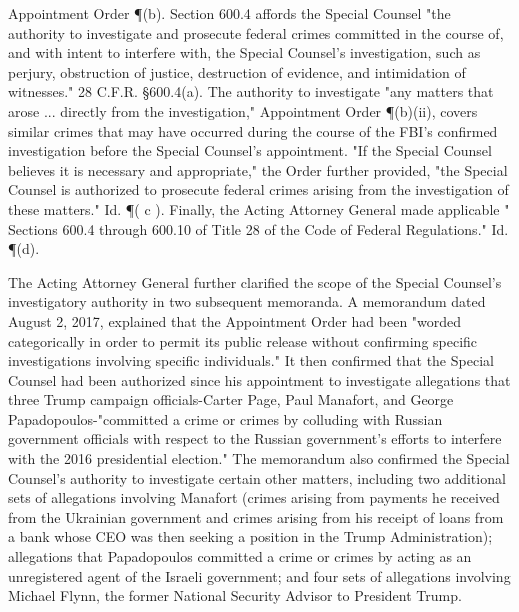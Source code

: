 \documentclass{article}
\begin{document}
Appointment Order \P (b). Section 600.4 affords the Special Counsel "the authority to investigate and prosecute federal crimes committed in the course of, and with intent to interfere with, the Special Counsel's investigation, such as perjury, obstruction of justice, destruction of evidence, and intimidation of witnesses." 28 C.F.R. \S 600.4(a).
The authority to investigate "any matters that arose ... directly from the investigation," Appointment Order \P (b)(ii), covers similar crimes that may have occurred during the course of the FBI's confirmed investigation before the Special Counsel's appointment.
"If the Special Counsel believes it is necessary and appropriate," the Order further provided, "the Special Counsel is authorized to prosecute federal crimes arising from the investigation of these matters." Id. \P ( c ).
Finally, the Acting Attorney General made applicable " Sections 600.4 through 600.10 of Title 28 of the Code of Federal Regulations." Id. \P (d).

The Acting Attorney General further clarified the scope of the Special Counsel's investigatory authority in two subsequent memoranda.
A memorandum dated August 2, 2017, explained that the Appointment Order had been "worded categorically in order to permit its public release without confirming specific investigations involving specific individuals."
It then confirmed that the Special Counsel had been authorized since his appointment to investigate allegations that three Trump campaign officials-Carter Page, Paul Manafort, and George Papadopoulos-"committed a crime or crimes by colluding with Russian government officials with respect to the Russian government's efforts to interfere with the 2016 presidential election."
The memorandum also confirmed the Special Counsel's authority to investigate certain other matters, including two additional sets of allegations involving Manafort (crimes arising from payments he received from the Ukrainian government and crimes arising from his receipt of loans from a bank whose CEO was then seeking a position in the Trump Administration); allegations that Papadopoulos committed a crime or crimes by acting as an unregistered agent of the Israeli government; and four sets of allegations involving Michael Flynn, the former National Security Advisor to President Trump.
\end{document}
